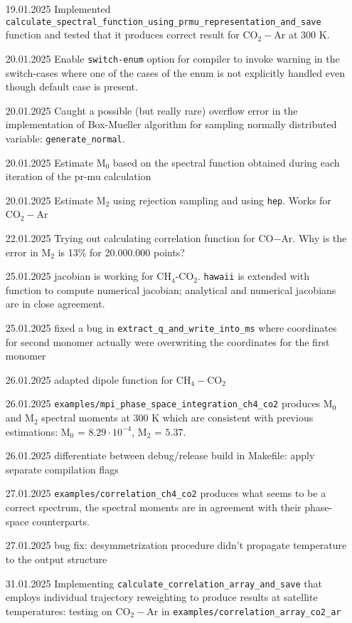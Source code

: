 \documentclass{article}
\begin{document}
\begin{enumerate}
    \item [19.01.2025] Implemented \texttt{calculate\_spectral\_function\_using\_prmu\_representation\_and\_save} function and tested that it produces correct result for CO$_2-$Ar at 300 K.
    \item [20.01.2025] Enable \texttt{switch-enum} option for compiler to invoke warning in the switch-cases where one of the cases of the enum is not explicitly handled even though default case is present. 
    \item [20.01.2025] Caught a possible (but really rare) overflow error in the implementation of Box-Mueller algorithm for sampling normally distributed variable: \texttt{generate\_normal}. 
    \item [20.01.2025] Estimate M$_0$ based on the spectral function obtained during each iteration of the pr-mu calculation
    \item [20.01.2025] Estimate M$_2$ using rejection sampling and using \texttt{hep}. Works for CO$_2-$Ar
    \item [22.01.2025] Trying out calculating correlation function for CO$-$Ar. {\color{red} Why is the error in M$_2$ is 13\% for 20.000.000 points?} 
    \item [25.01.2025] jacobian is working for CH$_4$-CO$_2$. \texttt{hawaii} is extended with function to compute numerical jacobian; analytical and numerical jacobians are in close agreement.
    \item [25.01.2025] fixed a bug in \texttt{extract\_q\_and\_write\_into\_ms} where coordinates for second monomer actually were overwriting the coordinates for the first monomer 
    \item [26.01.2025] adapted dipole function for CH$_4-$CO$_2$
    \item [26.01.2025] \texttt{examples/mpi\_phase\_space\_integration\_ch4\_co2} produces M$_0$ and M$_2$ spectral moments at 300 K which are consistent with previous estimations: M$_0$ =  $8.29 \cdot 10^{-4}$, M$_2$ = $5.37$. 
    \item [26.01.2025] differentiate between debug/release build in Makefile: apply separate compilation flags
    \item [27.01.2025] \texttt{examples/correlation\_ch4\_co2} produces what seems to be a correct spectrum, the spectral moments are in agreement with their phase-space counterparts.
    \item [27.01.2025] bug fix: desymmetrization procedure didn't propagate temperature to the output structure
    \item [31.01.2025] Implementing \texttt{calculate\_correlation\_array\_and\_save} that employs individual trajectory reweighting to produce results at satellite temperatures: testing on CO$_2-$Ar in \texttt{examples/correlation\_array\_co2\_ar}

\end{enumerate}
\end{document}
